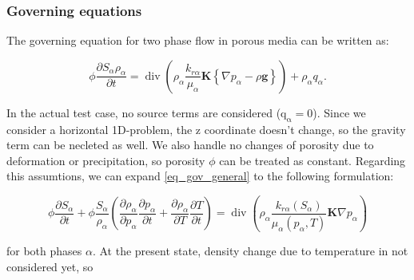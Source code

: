 


\subsubsection*{Governing equations}

The governing equation for two phase flow in porous media can be written as:

\begin{equation}
\phi\frac{\partial S_\alpha\rho_\alpha}{\partial t} = \operatorname{div}\left(\rho_\alpha\frac{k_{r\alpha}}{\mu_\alpha}\mathbf{K}\left\lbrace\nabla p_\alpha-\rho\mathbf{g}\right\rbrace\right)+\rho_\alpha q_\alpha.
\label{eq_gov_general}
\end{equation}

In the actual test case, no source terms are considered ($\mathrm{q_\alpha}=0$). Since we consider a horizontal 1D-problem, the z coordinate doesn't change, so the gravity term can be necleted as well. We also handle no changes of porosity due to deformation or precipitation, so porosity $\phi$ can be treated as constant. Regarding this assumtions, we can expand \eqref{eq_gov_general} to the following formulation:

\begin{equation}
\phi\frac{\partial S_\alpha}{\partial t}+\phi\frac{S_\alpha}{\rho_\alpha}\left(\frac{\partial\rho_\alpha}{\partial p_\alpha}\frac{\partial p_\alpha}{\partial t}+\frac{\partial\rho_\alpha}{\partial T}\frac{\partial T}{\partial t}\right) = \operatorname{div}\left(\rho_\alpha\frac{k_{r\alpha}\!\left(S_\alpha\right)}{\mu_\alpha\!\left(p_\alpha,T\right)}\mathbf{K}\nabla p_\alpha\right)
\label{eq_gov_specific}
\end{equation}

for both phases $\alpha$. At the present state, density change due to temperature in not considered yet, so

